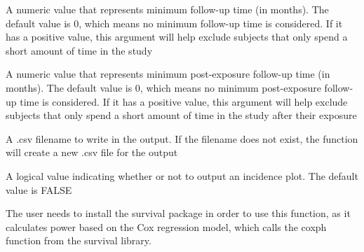 \documentclass[a4paper]{book}
\begin{document}
\begin{Arguments}
\begin{ldescription}
\item[\code{min.futime}] 
A numeric value that represents minimum follow-up time (in months). The default value is 0, which means no minimum follow-up time is considered. If it has a positive value, this argument will help exclude subjects that only spend a short amount of time in the study

\item[\code{min.postexp.futime}] 
A numeric value that represents minimum post-exposure follow-up time (in months). The default value is 0, which means no minimum post-exposure follow-up time is considered. If it has a positive value, this argument will help exclude subjects that only spend a short amount of time in the study after their exposure

\item[\code{output.fn}] 
A .csv filename to write in the output. If the filename does not exist, the function will create a new .csv file for the output

\item[\code{simu.plot}] 
A logical value indicating whether or not to output an incidence plot. The default value is FALSE

\end{ldescription}
\end{Arguments}
%
\begin{Details}\relax

The user needs to install the survival package in order to use this function, as it calculates power based on the Cox regression model, which calls the coxph function from the survival library.
\end{Details}
%
\end{document}
